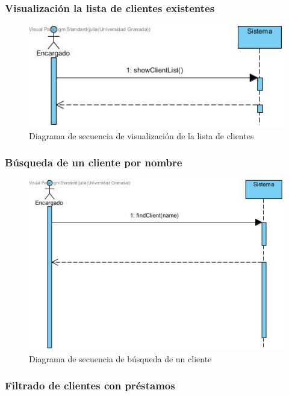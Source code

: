 \subsubsection{Visualización la lista de clientes existentes}

\begin{figure}[H]
	\centering
	\includegraphics[width=1\textwidth]{imagenes/imagenesDiagramas/Cliente/visualizarListaClientes.jpg}
	\caption{Diagrama de secuencia de visualización de la lista de clientes}
	\label{fig:seqdiag16}
\end{figure}

\subsubsection{Búsqueda de un cliente por nombre}

\begin{figure}[H]
	\centering
	\includegraphics[width=1\textwidth]{imagenes/imagenesDiagramas/Cliente/buscarClientes.jpg}
	\caption{Diagrama de secuencia de búsqueda de un cliente}
	\label{fig:seqdiag17}
\end{figure}

\subsubsection{Filtrado de clientes con préstamos}


